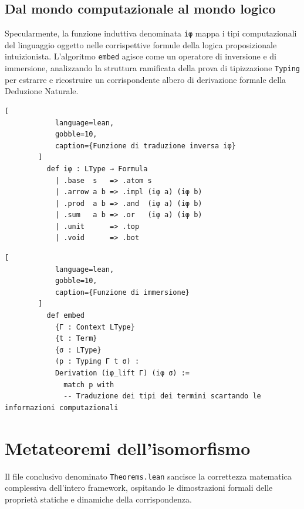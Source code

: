 \subsection{Dal mondo computazionale al mondo logico}
Specularmente, la funzione induttiva denominata \texttt{iφ} mappa i tipi computazionali del linguaggio oggetto nelle corrispettive formule della logica proposizionale intuizionista. L'algoritmo \texttt{embed} agisce come un operatore di inversione e di 
immersione, analizzando la struttura ramificata della prova di tipizzazione \texttt{Typing} per estrarre e ricostruire un corrispondente albero di derivazione formale della Deduzione Naturale.
\begin{center}
    \begin{minipage}{\textwidth}
        \begin{lstlisting}[
            language=lean, 
            gobble=10,
            caption={Funzione di traduzione inversa iφ}
        ]
          def iφ : LType → Formula
            | .base  s   => .atom s
            | .arrow a b => .impl (iφ a) (iφ b)
            | .prod  a b => .and  (iφ a) (iφ b)
            | .sum   a b => .or   (iφ a) (iφ b)
            | .unit      => .top
            | .void      => .bot
        \end{lstlisting}
    \end{minipage}
\end{center}

\begin{center}
    \begin{minipage}{\textwidth}
        \begin{lstlisting}[
            language=lean, 
            gobble=10,
            caption={Funzione di immersione}
        ]
          def embed 
            {Γ : Context LType} 
            {t : Term} 
            {σ : LType} 
            (p : Typing Γ t σ) : 
            Derivation (iφ_lift Γ) (iφ σ) :=
              match p with
              -- Traduzione dei tipi dei termini scartando le informazioni computazionali
        \end{lstlisting}
    \end{minipage}
\end{center}

\section{Metateoremi dell'isomorfismo}
Il file conclusivo denominato \texttt{Theorems.lean} sancisce la correttezza matematica complessiva dell'intero framework, ospitando le dimostrazioni formali delle proprietà statiche e dinamiche della corrispondenza.

